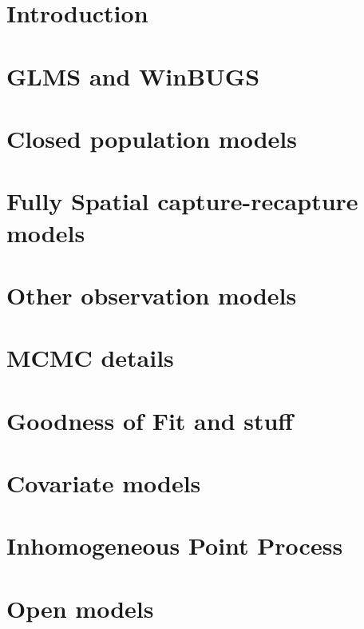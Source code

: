 \documentclass{book}
\begin{document}
\chapter{Introduction}
\label{chapt.intro}

\chapter{GLMS and WinBUGS}
\label{chapt.glms}

\chapter{Closed population models}
\label{chapt.closed}

\chapter{Fully Spatial capture-recapture models}
\label{chapt.scr0}

\chapter{Other observation models}
\label{chapt.poisson}

\chapter{MCMC details}
\label{chapt.mcmc}

\chapter{Goodness of Fit and stuff}
\label{chapt.gof}

\chapter{Covariate models}
\label{chapt.covariates}



\chapter{Inhomogeneous Point Process}
\label{chapt.ipp}

\chapter{Open models}
\label{chapt.open}







\end{document}
